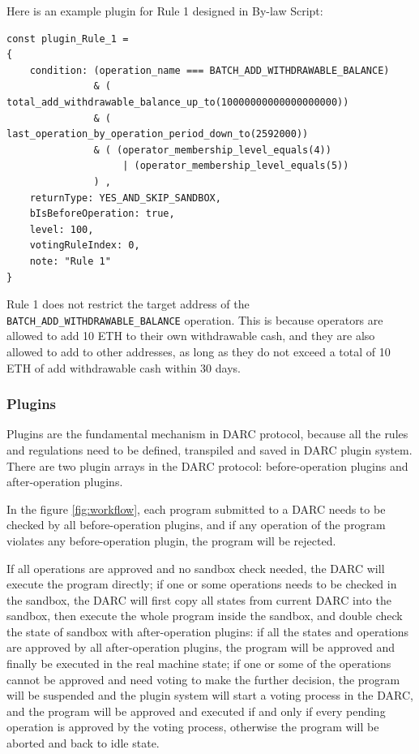 \documentclass[main.tex]{subfiles}
\begin{document}
Here is an example plugin for Rule 1 designed in By-law Script:

\begin{verbatim}
const plugin_Rule_1 = 
{
    condition: (operation_name === BATCH_ADD_WITHDRAWABLE_BALANCE)
               & ( total_add_withdrawable_balance_up_to(10000000000000000000))
               & ( last_operation_by_operation_period_down_to(2592000)) 
               & ( (operator_membership_level_equals(4)) 
                    | (operator_membership_level_equals(5)) 
               ) ,
    returnType: YES_AND_SKIP_SANDBOX,
    bIsBeforeOperation: true,
    level: 100,
    votingRuleIndex: 0,
    note: "Rule 1"
}
\end{verbatim}

Rule 1 does not restrict the target address of the \texttt{BATCH\_ADD\_WITHDRAWABLE\_BALANCE} operation. This is because operators are allowed to add 10 ETH to their own withdrawable cash, and they are also allowed to add to other addresses, as long as they do not exceed a total of 10 ETH of add withdrawable cash within 30 days.

\subsubsection{Plugins}

Plugins are the fundamental mechanism in DARC protocol, because all the rules and regulations need to be defined, transpiled and saved in DARC plugin system. There are two plugin arrays in the DARC protocol: before-operation plugins and after-operation plugins.


In the figure \ref{fig:workflow}, each program submitted to a DARC needs to be checked by all before-operation plugins, and if any operation of the program violates any before-operation plugin, the program will be rejected. 

If all operations are approved and no sandbox check needed, the DARC will execute the program directly; if one or some operations needs to be checked in the sandbox, the DARC will first copy all states from current DARC into the sandbox, then execute the whole program inside the sandbox, and double check the state of sandbox with after-operation plugins: if all the states and operations are approved by all after-operation plugins, the program will be approved and finally be executed in the real machine state; if one or some of the operations cannot be approved and need voting to make the further decision, the program will be suspended and the plugin system will start a voting process in the DARC, and the program will be approved and executed if and only if every pending operation is approved by the voting process, otherwise the program will be aborted and back to idle state.
\end{document}
